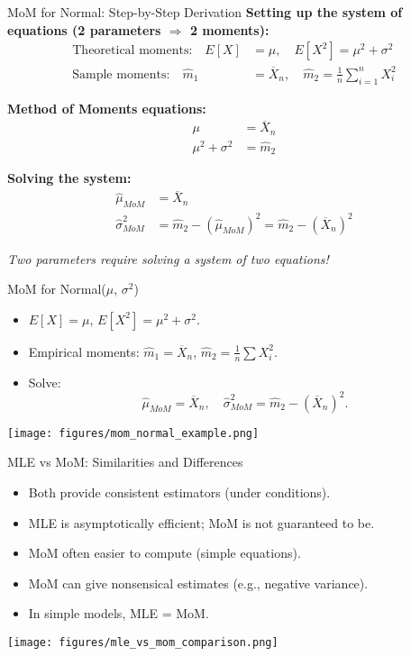 \begin{frame}{MoM for Normal: Step-by-Step Derivation}
  \textbf{Setting up the system of equations (2 parameters $\Rightarrow$ 2 moments):}
  \begin{align}
    \text{Theoretical moments:} \quad E[X] &= \mu, \quad E[X^2] = \mu^2 + \sigma^2 \\
    \text{Sample moments:} \quad \hat{m}_1 &= \overline{X}_n, \quad \hat{m}_2 = \frac{1}{n}\sum_{i=1}^n X_i^2
  \end{align}

  \textbf{Method of Moments equations:}
  \begin{align}
    \mu &= \overline{X}_n \\
    \mu^2 + \sigma^2 &= \hat{m}_2
  \end{align}

  \textbf{Solving the system:}
  \begin{align}
    \hat{\mu}_{MoM} &= \overline{X}_n \\
    \hat{\sigma}^2_{MoM} &= \hat{m}_2 - (\hat{\mu}_{MoM})^2 = \hat{m}_2 - (\overline{X}_n)^2
  \end{align}

  \textit{Two parameters require solving a system of two equations!}
\end{frame}

\begin{frame}{MoM for Normal($\mu$, $\sigma^2$)}
  \begin{itemize}
    \item $E[X] = \mu$, $E[X^2] = \mu^2 + \sigma^2$.
    \item Empirical moments:
      $\hat{m}_1 = \overline{X}_n$, $\hat{m}_2 = \tfrac{1}{n}\sum X_i^2$.
    \item Solve:
      \[ \hat{\mu}_{MoM} = \overline{X}_n, \quad \hat{\sigma}^2_{MoM} = \hat{m}_2 - (\overline{X}_n)^2. \]
  \end{itemize}
  \begin{center}
    \texttt{[image: figures/mom\_normal\_example.png]}
  \end{center}
\end{frame}

\begin{frame}{MLE vs MoM: Similarities and Differences}
  \begin{itemize}
    \item Both provide consistent estimators (under conditions).
    \item MLE is asymptotically efficient; MoM is not guaranteed to be.
    \item MoM often easier to compute (simple equations).
    \item MoM can give nonsensical estimates (e.g., negative variance).
    \item In simple models, MLE = MoM.
  \end{itemize}
  \begin{center}
    \texttt{[image: figures/mle\_vs\_mom\_comparison.png]}
  \end{center}
\end{frame}


